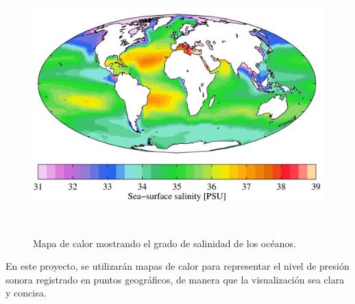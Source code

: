 \begin{figure}[h] \centering
    \includegraphics[height=10cm]{graphs/saltheatmap.png}\caption{Mapa de calor mostrando el grado de salinidad de los océanos.\cite{wikiheatmap}}\label{fig:saltheatmap}
\end{figure}



En este proyecto, se utilizarán mapas de calor para representar el nivel de presión sonora registrado en puntos geográficos, de manera que la visualización sea clara y concisa.

\chapterend{}